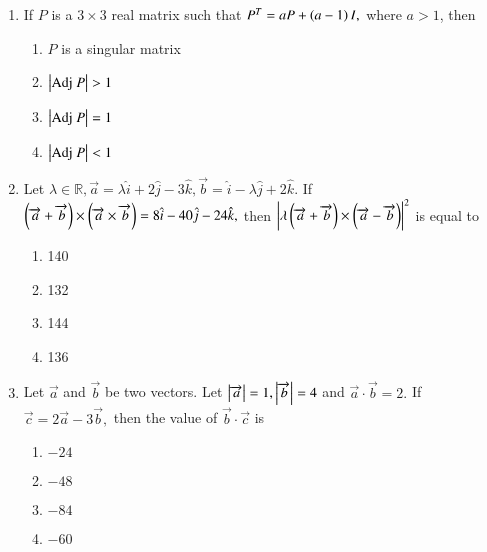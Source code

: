 \documentclass[journal,9pt,onecolumn]{IEEEtran}
\begin{document}
\begin{enumerate}
\item If $P$ is a $3 \times 3$ real matrix such that $P^T = aP + \left(a - 1\right)I,$ where $a > 1$, then 
\begin{multicols}{2}
\begin{enumerate}
    \item $P$ is a singular matrix
    \item $\left\vert\text{Adj } P\right\vert > 1$
    \item $\left\vert\text{Adj } P\right\vert = 1$
    \item $\left\vert\text{Adj } P\right\vert < 1$
\end{enumerate}
\end{multicols}

\item Let $\lambda \in \mathbb{R}, \overrightarrow{a} = \lambda \hat{i} + 2 \hat{j} - 3 \hat{k}, \overrightarrow{b} = \hat{i} - \lambda \hat{j} + 2 \hat{k}.$ If $\left(\overrightarrow{a} + \overrightarrow{b}\right) \times \left(\overrightarrow{a} \times \overrightarrow{b}\right) = 8 \hat{i} - 40 \hat{j} - 24 \hat{k},
$ then $\left\vert\lambda \left(\overrightarrow{a} + \overrightarrow{b}\right) \times \left(\overrightarrow{a} - \overrightarrow{b}\right)\right\vert^2$ is equal to 
\begin{multicols}{4}
\begin{enumerate}
    \item 140 
    \item 132 
    \item 144 
    \item 136 
\end{enumerate}
\end{multicols}


\item Let $\overrightarrow{a}$ and $\overrightarrow{b}$ be two vectors. Let $\left\vert\overrightarrow{a}\right\vert = 1, \left\vert\overrightarrow{b}\right\vert = 4$ and $\overrightarrow{a} \cdot \overrightarrow{b} = 2.$ If $\overrightarrow{c} = 2\overrightarrow{a} - 3\overrightarrow{b},$ then the value of $\overrightarrow{b} \cdot \overrightarrow{c}$ is 
\begin{multicols}{4}
\begin{enumerate}
    \item $-24$ 
    \item $-48$ 
    \item $-84$ 
    \item $-60$ 
\end{enumerate}
\end{multicols}



\end{enumerate}
\end{document}
